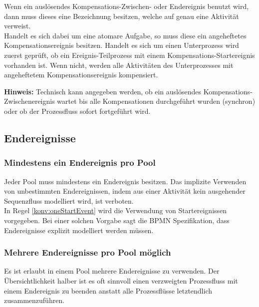 \documentclass[12pt,report]{../../Templates/snetTeaching}
\begin{document}
Wenn ein auslösendes Kompensations-Zwischen- oder Endereignis benutzt wird, dann muss dieses eine Bezeichnung besitzen, welche auf genau eine  Aktivität verweist. \\
Handelt es sich dabei um eine atomare Aufgabe, so muss diese ein angeheftetes Kompensationsereignis besitzen. 
Handelt es sich um einen Unterprozess wird zuerst geprüft, ob ein Ereignis-Teilprozess mit einem Kompensations-Startereignis vorhanden ist. Wenn nicht, werden alle Aktivitäten des Unterprozesses mit angeheftetem Kompensationsereignis kompensiert.

\begin{Rahmen}
\end{Rahmen}

\textbf{Hinweis:} Technisch kann angegeben werden, ob ein auslösendes Kompensations-Zwischenereignis wartet bis alle Kompensationen durchgeführt wurden (synchron) oder ob der Prozessfluss sofort fortgeführt wird.


\clearpage
\subsection{Endereignisse}

\subsubsection{Mindestens ein Endereignis pro Pool}

Jeder Pool muss mindestens ein Endereignis besitzen. Das implizite Verwenden von unbestimmten Endereignissen, indem aus einer Aktivität kein ausgehender Sequenzfluss modelliert wird, ist verboten. \\
In Regel \ref{konv:oneStartEvent} wird die Verwendung von Startereignissen vorgegeben. Bei einer solchen Vorgabe sagt die BPMN Spezifikation, dass Endereignisse explizit modelliert werden müssen. 

\begin{Rahmen}
	\hfill
\end{Rahmen}

\subsubsection{Mehrere Endereignisse pro Pool möglich}

Es ist erlaubt in einem Pool mehrere Endereignisse zu verwenden. Der Übersichtlichkeit halber ist es oft sinnvoll einen verzweigten Prozessfluss mit einem Endereignis zu beenden anstatt alle Prozessflüsse letztendlich zusammenzuführen.
\end{document}

